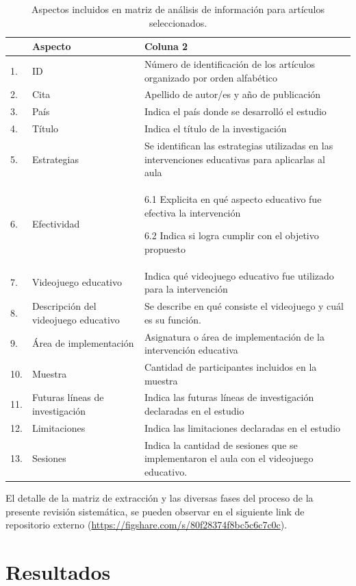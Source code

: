 \documentclass[spanish]{textolivre}
\begin{document}
\begin{table}[htpb]
\caption{Aspectos incluidos en matriz de análisis de información para artículos seleccionados.}
\label{tbl1}
\begin{tabular}{llp{7.5cm}}
\toprule 
 & \textbf{Aspecto} & \textbf{Coluna 2}                                      \\ 
\midrule
1.    & ID  & Número de identificación de los artículos organizado por orden alfabético
\\ 
2. & Cita & Apellido de autor/es y año de publicación
\\
3. & País & Indica el país donde se desarrolló el estudio
\\
4. & Título & Indica el título de la investigación
\\
5. & Estrategias & Se identifican las estrategias utilizadas en las intervenciones educativas para aplicarlas al aula
\\
6. & Efectividad & 6.1 Explicita en qué aspecto educativo fue efectiva la intervención

6.2 Indica si logra cumplir con el objetivo propuesto
\\
7. & Videojuego educativo & Indica qué videojuego educativo fue utilizado para la intervención
\\
8. & Descripción del videojuego educativo & Se describe en qué consiste el videojuego y cuál es su función.
\\
9. & Área de implementación & Asignatura o área de implementación de la intervención educativa
\\
10. & Muestra & Cantidad de participantes incluidos en la muestra
\\
11.  & Futuras líneas de investigación & Indica las futuras líneas de investigación declaradas en el estudio
\\
12. & Limitaciones & Indica las limitaciones declaradas en el estudio
\\
13. & Sesiones & Indica la cantidad de sesiones que se implementaron el aula con el videojuego educativo.
\\
\bottomrule
\end{tabular}
\end{table}

El detalle de la matriz de extracción y las diversas fases del proceso de la presente revisión sistemática, se pueden observar en el siguiente link de repositorio externo (\url{https://figshare.com/s/80f28374f8bc5c6c7c0c}).


\section{Resultados}\label{sec-formato}
\end{document}
